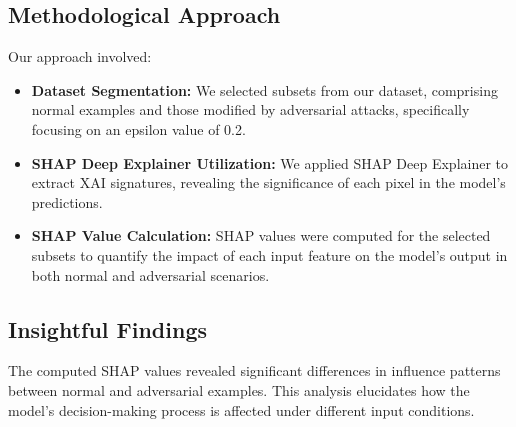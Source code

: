 \documentclass[10pt, conference, a4paper, final]{IEEEtran}
\begin{document}
\subsection{Methodological Approach}
Our approach involved:
\begin{itemize}
    \item \textbf{Dataset Segmentation:} We selected subsets from our dataset, comprising normal examples and those modified by adversarial attacks, specifically focusing on an epsilon value of 0.2.
    \item \textbf{SHAP Deep Explainer Utilization:} We applied SHAP Deep Explainer to extract XAI signatures, revealing the significance of each pixel in the model’s predictions.
    \item \textbf{SHAP Value Calculation:} SHAP values were computed for the selected subsets to quantify the impact of each input feature on the model's output in both normal and adversarial scenarios.
\end{itemize}

\subsection{Insightful Findings}
The computed SHAP values revealed significant differences in influence patterns between normal and adversarial examples. This analysis elucidates how the model's decision-making process is affected under different input conditions.
\end{document}
